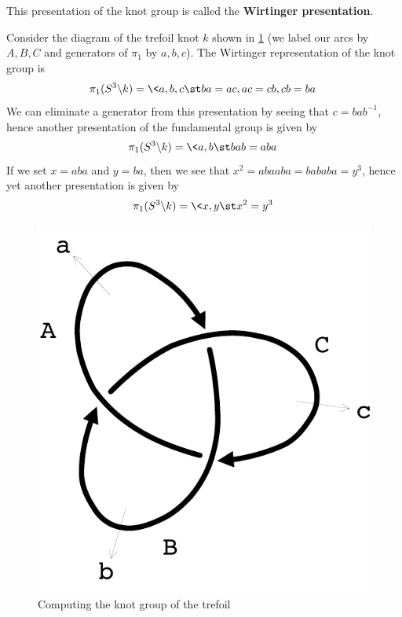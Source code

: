 This presentation of the knot group is called the \textbf{Wirtinger presentation}.

\begin{example}
Consider the diagram of the trefoil knot $k$ shown in \cref{knot-group-trefoil} (we label our arcs by $A,B,C$ and generators of $\pi_1$ by $a,b,c$). The Wirtinger representation of the knot group is
\[ \pi_1(S^3 \backslash k) = \< a,b,c \st ba=ac, ac=cb, cb=ba \> \]
We can eliminate a generator from this presentation by seeing that $c = bab^{-1}$, hence another presentation of the fundamental group is given by
\[ \pi_1(S^3 \backslash k) = \< a,b \st bab=aba \> \]
If we set $x = aba$ and $y=ba$, then we see that $x^2 = abaaba = bababa = y^3$, hence yet another presentation is given by
\[ \pi_1(S^3 \backslash k) = \< x,y \st x^2 = y^3 \> \]

\begin{figure}[tb]
\centering
\includegraphics[scale=.5]{graphics/knot-group-trefoil}
\caption{Computing the knot group of the trefoil}
\label{knot-group-trefoil}
\end{figure}
\end{example}


